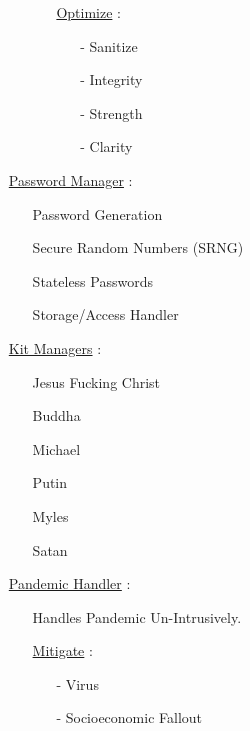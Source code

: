 \documentclass[11pt]{article}
\begin{document}
\begin{enumerate}
\begin{enumerate}
\begin{enumerate}
			\item[] \ul{Optimize} :
			\begin{enumerate}
				\item[-] Sanitize
				\item[-] Integrity
				\item[-] Strength
				\item[-] Clarity
			\end{enumerate}
		\end{enumerate}
	\end{enumerate}

	\item[] \ul{Password Manager} :
	\begin{enumerate}
		\item[] Password Generation
		\item[] Secure Random Numbers (SRNG)
		\item[] Stateless Passwords
		\item[] Storage/Access Handler
	\end{enumerate}

	\item[] \ul{Kit Managers} :
	\begin{enumerate}
		\item[] Jesus Fucking Christ
		\item[] Buddha
		\item[] Michael
		\item[] Putin
		\item[] Myles
		\item[] Satan
	\end{enumerate}

	\item[] \ul{Pandemic Handler} :
	\begin{enumerate}
		\item[] Handles Pandemic Un-Intrusively.
		\item[] \ul{Mitigate} :
		\begin{enumerate}
			\item[-] Virus
			\item[-] Socioeconomic Fallout
		\end{enumerate}
	\end{enumerate}
\end{enumerate}
\end{document}
